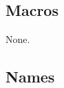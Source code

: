 \documentclass[12pt]{article}
\begin{document}
\subsection{Macros}
\label{sec:macros}


None.




\subsection{Names}
\label{sec:names}












\end{document}
